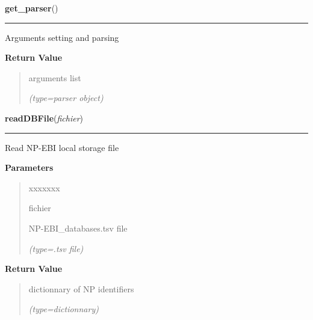     \vspace{0.5ex}

\hspace{.8\funcindent}\begin{boxedminipage}{\funcwidth}

    \raggedright \textbf{get\_parser}()

    \vspace{-1.5ex}

    \rule{\textwidth}{0.5\fboxrule}
\setlength{\parskip}{2ex}
    Arguments setting and parsing

\setlength{\parskip}{1ex}
      \textbf{Return Value}
    \vspace{-1ex}

      \begin{quote}
      arguments list

      {\it (type=parser object)}

      \end{quote}

    \end{boxedminipage}

    \label{GoXML:readDBFile}

    \vspace{0.5ex}

\hspace{.8\funcindent}\begin{boxedminipage}{\funcwidth}

    \raggedright \textbf{readDBFile}(\textit{fichier})

    \vspace{-1.5ex}

    \rule{\textwidth}{0.5\fboxrule}
\setlength{\parskip}{2ex}
    Read NP-EBI local storage file

\setlength{\parskip}{1ex}
      \textbf{Parameters}
      \vspace{-1ex}

      \begin{quote}
        \begin{Ventry}{xxxxxxx}

          \item[fichier]

          NP-EBI\_databases.tsv file

            {\it (type=.tsv file)}

        \end{Ventry}

      \end{quote}

      \textbf{Return Value}
    \vspace{-1ex}

      \begin{quote}
      dictionnary of NP identifiers

      {\it (type=dictionnary)}

      \end{quote}

    \end{boxedminipage}

